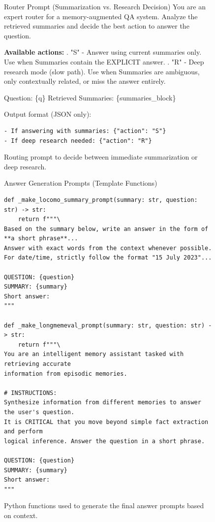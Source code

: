 \documentclass{article}
\theoremstyle{plain}
\theoremstyle{definition}
\theoremstyle{remark}
\begin{document}
\begin{figure}[htb]
\begin{AIbox}[width=\textwidth]{Router Prompt (Summarization vs. Research Decision)}
\footnotesize
You are an expert router for a memory-augmented QA system. Analyze the retrieved summaries and decide the best action to answer the question.

\textbf{Available actions:} . "S" - Answer using current summaries only. Use when Summaries contain the EXPLICIT answer. . "R" - Deep research mode (slow path). Use when Summaries are ambiguous, only contextually related, or miss the answer entirely.

Question: \{q\} \newline
Retrieved Summaries: \{summaries\_block\}

Output format (JSON only):
\begin{verbatim}
- If answering with summaries: {"action": "S"}
- If deep research needed: {"action": "R"}
\end{verbatim}
\end{AIbox}
\caption{Routing prompt to decide between immediate summarization or deep research.}
\label{fig:router_prompt}
\end{figure}

\begin{figure}[htb]
\begin{AIbox}[width=\textwidth]{Answer Generation Prompts (Template Functions)}
\footnotesize
\begin{verbatim}
def _make_locomo_summary_prompt(summary: str, question: str) -> str:
    return f"""\
Based on the summary below, write an answer in the form of **a short phrase**...
Answer with exact words from the context whenever possible.
For date/time, strictly follow the format "15 July 2023"...

QUESTION: {question}
SUMMARY: {summary}
Short answer:
"""

def _make_longmemeval_prompt(summary: str, question: str) -> str:
    return f"""\
You are an intelligent memory assistant tasked with retrieving accurate 
information from episodic memories.

# INSTRUCTIONS:
Synthesize information from different memories to answer the user's question.
It is CRITICAL that you move beyond simple fact extraction and perform 
logical inference. Answer the question in a short phrase.

QUESTION: {question}
SUMMARY: {summary}
Short answer:
"""
\end{verbatim}
\end{AIbox}
\caption{Python functions used to generate the final answer prompts based on context.}
\label{fig:answer_prompts}
\end{figure}
\end{document}
